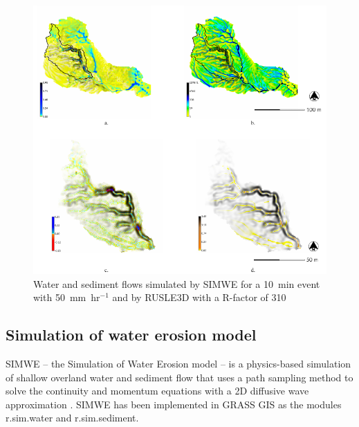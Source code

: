 \documentclass[gmd, manuscript]{copernicus}
\begin{document}
\begin{figure}%
\center
\includegraphics[width=\textwidth,height=0.95\textheight,keepaspectratio]{figures/models.pdf}
\caption{Water and sediment flows simulated by SIMWE 
for a 10~\unit{min} event with 50~\unit{mm~hr}$^{-1}$
and by RUSLE3D with a R-factor of 310
}
\label{fig:models}
\end{figure}

\subsection{Simulation of water erosion model} \label{simwe}
SIMWE -- the Simulation of Water Erosion model -- 
is a physics-based simulation of shallow overland water and sediment flow
that uses a path sampling method to solve the continuity and momentum equations 
with a 2D diffusive wave approximation 
\citep{Mitas1998,Mitasova2004}.
SIMWE has been implemented in GRASS GIS as the modules 
r.sim.water
and r.sim.sediment.
\end{document}
